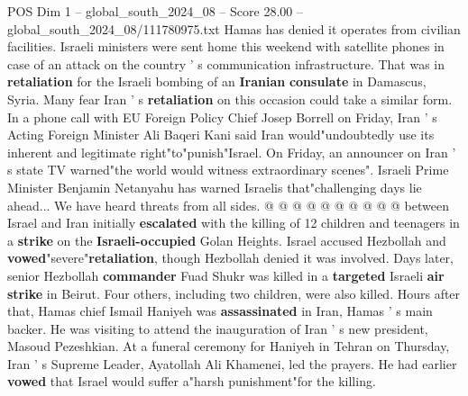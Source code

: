 \begin{textsample}{POS Dim 1 – global\_south\_2024\_08 – Score 28.00 – global\_south\_2024\_08/111780975.txt}
Hamas has denied it operates from civilian facilities.
Israeli ministers were sent home this weekend with satellite phones in case of an attack on the country ' s communication infrastructure.
That was in \textbf{retaliation} for the Israeli bombing of an \textbf{Iranian} \textbf{consulate} in Damascus, Syria.
Many fear Iran ' s \textbf{retaliation} on this occasion could take a similar form.
In a phone call with EU Foreign Policy Chief Josep Borrell on Friday, Iran ' s Acting Foreign Minister Ali Baqeri Kani said Iran would"undoubtedly use its inherent and legitimate right"to"punish"Israel.
On Friday, an announcer on Iran ' s state TV warned"the world would witness extraordinary scenes".
Israeli Prime Minister Benjamin Netanyahu has warned Israelis that"challenging days lie ahead...
We have heard threats from all sides. @ @ @ @ @ @ @ @ @ @ between Israel and Iran initially \textbf{escalated} with the killing of 12 children and teenagers in a \textbf{strike} on the \textbf{Israeli-occupied} Golan Heights.
Israel accused Hezbollah and \textbf{vowed}"severe"\textbf{retaliation}, though Hezbollah denied it was involved.
Days later, senior Hezbollah \textbf{commander} Fuad Shukr was killed in a \textbf{targeted} Israeli \textbf{air} \textbf{strike} in Beirut.
Four others, including two children, were also killed.
Hours after that, Hamas chief Ismail Haniyeh was \textbf{assassinated} in Iran, Hamas ' s main backer.
He was visiting to attend the inauguration of Iran ' s new president, Masoud Pezeshkian.
At a funeral ceremony for Haniyeh in Tehran on Thursday, Iran ' s Supreme Leader, Ayatollah Ali Khamenei, led the prayers.
He had earlier \textbf{vowed} that Israel would suffer a"harsh punishment"for the killing.

\end{textsample}
